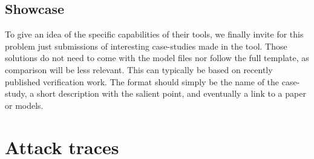 \documentclass{article}
\begin{document}
\subsection{Showcase}\label{prob:showcase}

To give an idea of the specific capabilities of their tools, we finally invite for this problem just submissions of interesting case-studies made in the tool. Those solutions do not need to come with the model files nor follow the full template, as comparison will be less relevant. This can typically be based on recently published verification work. The format should simply be the name of the case-study, a short description with the salient point, and eventually a link to a paper or models.

\appendix

\section{Attack traces}\label{app:attacks}
\end{document}

